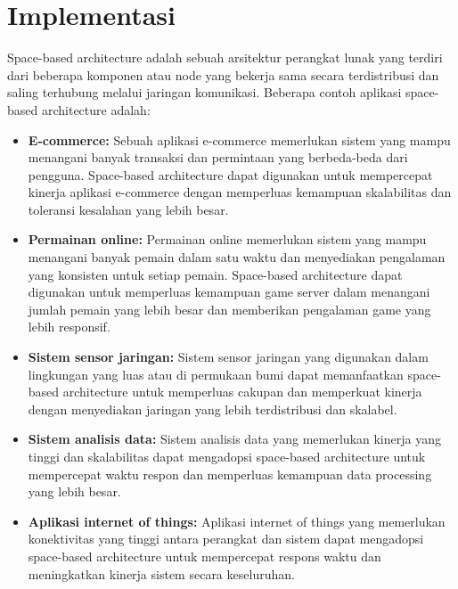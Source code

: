 \section{{Implementasi}}
 Space-based architecture adalah sebuah arsitektur perangkat lunak yang terdiri dari beberapa komponen atau node yang bekerja sama secara terdistribusi dan saling terhubung melalui jaringan komunikasi. Beberapa contoh aplikasi space-based architecture adalah:
\begin{itemize}
	\item  {\textbf{E-commerce:}} Sebuah aplikasi e-commerce memerlukan sistem yang mampu menangani banyak transaksi dan permintaan yang berbeda-beda dari pengguna. Space-based architecture dapat digunakan untuk mempercepat kinerja aplikasi e-commerce dengan memperluas kemampuan skalabilitas dan toleransi kesalahan yang lebih besar.
	\item  {\textbf{Permainan online:}} Permainan online memerlukan sistem yang mampu menangani banyak pemain dalam satu waktu dan menyediakan pengalaman yang konsisten untuk setiap pemain. Space-based architecture dapat digunakan untuk memperluas kemampuan game server dalam menangani jumlah pemain yang lebih besar dan memberikan pengalaman game yang lebih responsif.
	\item  {\textbf{Sistem sensor jaringan:}} Sistem sensor jaringan yang digunakan dalam lingkungan yang luas atau di permukaan bumi dapat memanfaatkan space-based architecture untuk memperluas cakupan dan memperkuat kinerja dengan menyediakan jaringan yang lebih terdistribusi dan skalabel.
	\item  {\textbf{Sistem analisis data:}} Sistem analisis data yang memerlukan kinerja yang tinggi dan skalabilitas dapat mengadopsi space-based architecture untuk mempercepat waktu respon dan memperluas kemampuan data processing yang lebih besar.
	\item  {\textbf{Aplikasi internet of things:}} Aplikasi internet of things yang memerlukan konektivitas yang tinggi antara perangkat dan sistem dapat mengadopsi space-based architecture untuk mempercepat respons waktu dan meningkatkan kinerja sistem secara keseluruhan.
\end{itemize}
%